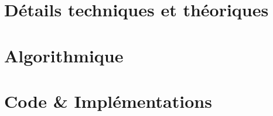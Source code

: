 \chapter{Détails techniques et théoriques}




% 
% 

\chapter{Algorithmique}


\chapter{Code \& Implémentations}
